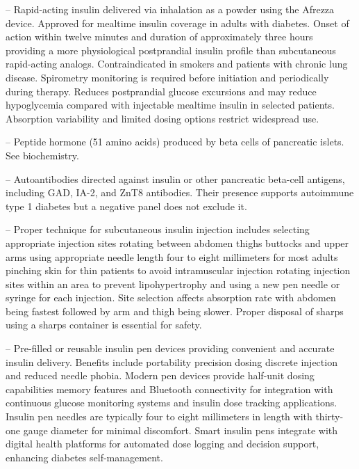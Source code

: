 -- Rapid-acting insulin delivered via inhalation as a powder using the Afrezza device. Approved for mealtime insulin coverage in adults with diabetes. Onset of action within twelve minutes and duration of approximately three hours providing a more physiological postprandial insulin profile than subcutaneous rapid-acting analogs. Contraindicated in smokers and patients with chronic lung disease. Spirometry monitoring is required before initiation and periodically during therapy. Reduces postprandial glucose excursions and may reduce hypoglycemia compared with injectable mealtime insulin in selected patients. Absorption variability and limited dosing options restrict widespread use.

-- Peptide hormone (51 amino acids) produced by beta cells of pancreatic islets. See biochemistry.

-- Autoantibodies directed against insulin or other pancreatic beta-cell antigens, including GAD, IA-2, and ZnT8 antibodies. Their presence supports autoimmune type 1 diabetes but a negative panel does not exclude it.

-- Proper technique for subcutaneous insulin injection includes selecting appropriate injection sites rotating between abdomen thighs buttocks and upper arms using appropriate needle length four to eight millimeters for most adults pinching skin for thin patients to avoid intramuscular injection rotating injection sites within an area to prevent lipohypertrophy and using a new pen needle or syringe for each injection. Site selection affects absorption rate with abdomen being fastest followed by arm and thigh being slower. Proper disposal of sharps using a sharps container is essential for safety.

-- Pre-filled or reusable insulin pen devices providing convenient and accurate insulin delivery. Benefits include portability precision dosing discrete injection and reduced needle phobia. Modern pen devices provide half-unit dosing capabilities memory features and Bluetooth connectivity for integration with continuous glucose monitoring systems and insulin dose tracking applications. Insulin pen needles are typically four to eight millimeters in length with thirty-one gauge diameter for minimal discomfort. Smart insulin pens integrate with digital health platforms for automated dose logging and decision support, enhancing diabetes self-management.

